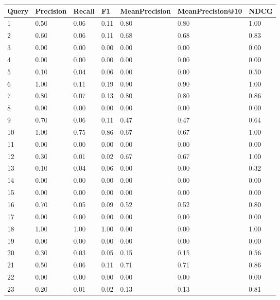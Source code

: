 \documentclass[12pt]{article}
\begin{document}
\begin{longtable}[c]{|l|l|l|l|l|l|l|}
  \hline
  Query & Precision & Recall & F1 & MeanPrecision & MeanPrecision@10 & NDCG \\ \hline
  \endhead
  1 & 0.50 & 0.06 & 0.11 & 0.80 & 0.80 & 1.00 \\ \hline
  2 & 0.60 & 0.06 & 0.11 & 0.68 & 0.68 & 0.83 \\ \hline
  3 & 0.00 & 0.00 & 0.00 & 0.00 & 0.00 & 0.00 \\ \hline
  4 & 0.00 & 0.00 & 0.00 & 0.00 & 0.00 & 0.00 \\ \hline
  5 & 0.10 & 0.04 & 0.06 & 0.00 & 0.00 & 0.50 \\ \hline
  6 & 1.00 & 0.11 & 0.19 & 0.90 & 0.90 & 1.00 \\ \hline
  7 & 0.80 & 0.07 & 0.13 & 0.80 & 0.80 & 0.86 \\ \hline
  8 & 0.00 & 0.00 & 0.00 & 0.00 & 0.00 & 0.00 \\ \hline
  9 & 0.70 & 0.06 & 0.11 & 0.47 & 0.47 & 0.64 \\ \hline
  10 & 1.00 & 0.75 & 0.86 & 0.67 & 0.67 & 1.00 \\ \hline
  11 & 0.00 & 0.00 & 0.00 & 0.00 & 0.00 & 0.00 \\ \hline
  12 & 0.30 & 0.01 & 0.02 & 0.67 & 0.67 & 1.00 \\ \hline
  13 & 0.10 & 0.04 & 0.06 & 0.00 & 0.00 & 0.32 \\ \hline
  14 & 0.00 & 0.00 & 0.00 & 0.00 & 0.00 & 0.00 \\ \hline
  15 & 0.00 & 0.00 & 0.00 & 0.00 & 0.00 & 0.00 \\ \hline
  16 & 0.70 & 0.05 & 0.09 & 0.52 & 0.52 & 0.80 \\ \hline
  17 & 0.00 & 0.00 & 0.00 & 0.00 & 0.00 & 0.00 \\ \hline
  18 & 1.00 & 1.00 & 1.00 & 0.00 & 0.00 & 1.00 \\ \hline
  19 & 0.00 & 0.00 & 0.00 & 0.00 & 0.00 & 0.00 \\ \hline
  20 & 0.30 & 0.03 & 0.05 & 0.15 & 0.15 & 0.56 \\ \hline
  21 & 0.50 & 0.06 & 0.11 & 0.71 & 0.71 & 0.86 \\ \hline
  22 & 0.00 & 0.00 & 0.00 & 0.00 & 0.00 & 0.00 \\ \hline
  23 & 0.20 & 0.01 & 0.02 & 0.13 & 0.13 & 0.81 \\ \hline

\end{longtable}
\end{document}
